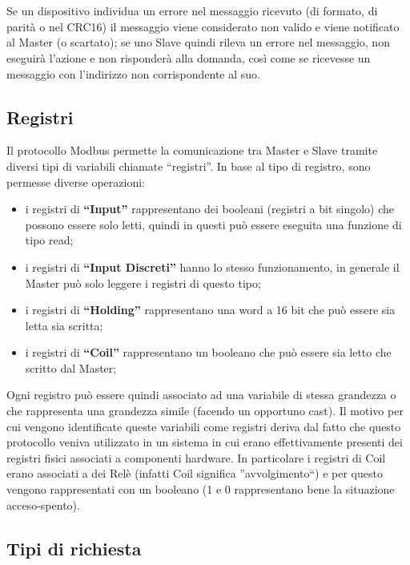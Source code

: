 \documentclass[a4paper,titlepage]{book}
\newcommand{\itema}{\begin{itemize}[noitemsep,topsep=10pt,parsep=5pt,partopsep=10pt]}
\begin{document}
~

~

Se un dispositivo individua un errore nel messaggio ricevuto (di formato, di parità o nel CRC16) il messaggio viene considerato non valido e viene notificato al Master (o scartato); se uno Slave quindi rileva un errore nel messaggio, non eseguirà l'azione e non risponderà alla domanda, così come se ricevesse un messaggio con l'indirizzo non corrispondente al suo.


\subsection{Registri}

Il protocollo Modbus permette la comunicazione tra Master e Slave tramite diversi tipi di variabili chiamate ``registri''. In base al tipo di registro, sono permesse diverse operazioni:

\itema

\item i registri di \textbf{``Input''} rappresentano dei booleani (registri a bit singolo) che possono essere solo letti, quindi in questi può essere eseguita una funzione di tipo read;
\item i registri di \textbf{``Input Discreti''} hanno lo stesso funzionamento, in generale il Master può solo leggere i registri di questo tipo;
\item i registri di \textbf{``Holding''} rappresentano una word a 16 bit che può essere sia letta sia scritta;
\item i registri di \textbf{``Coil''} rappresentano un booleano che può essere sia letto che scritto dal Master;

\end{itemize}

Ogni registro può essere quindi associato ad una variabile di stessa grandezza o che rappresenta una grandezza simile (facendo un opportuno cast). Il motivo per cui vengono identificate queste variabili come registri deriva dal fatto che questo protocollo veniva utilizzato in un sistema in cui erano effettivamente presenti dei registri fisici associati a componenti hardware. In particolare i registri di Coil erano associati a dei Relè (infatti Coil significa ''avvolgimento``) e per questo vengono rappresentati con un booleano (1 e 0 rappresentano bene la situazione acceso-spento).

\subsection{Tipi di richiesta}
\end{document}

